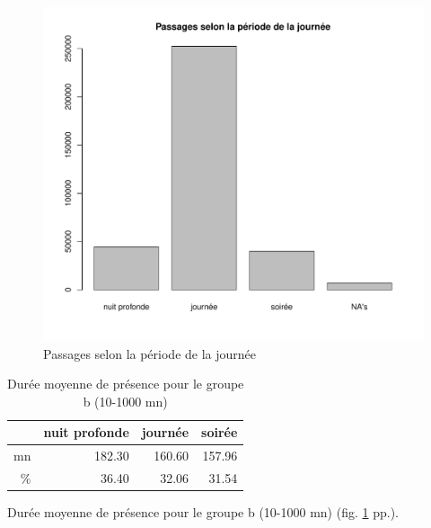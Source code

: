 \documentclass[12pt,english,french,twoside]{book}\usepackage[]{graphicx}\usepackage[]{color}
\makeatletter
\def\maxwidth{ %
  \ifdim\Gin@nat@width>\linewidth
    \linewidth
  \else
    \Gin@nat@width
  \fi
}
\newenvironment{knitrout}{}{} %
\makeatother
\begin{document}
\begin{figure}[ht!]
 \centering
\begin{knitrout}
\color{fgcolor}
\includegraphics[width=\maxwidth]{figure/periode_1} 

\end{knitrout}

 \caption{Passages selon la période de la journée}
 \label{fig:bp_periode1}
\end{figure}

\begin{table}[ht]
\centering
\begin{tabular}{rrrr}
  \hline
 & nuit profonde & journée & soirée \\ 
  \hline
mn & 182.30 & 160.60 & 157.96 \\ 
  \% & 36.40 & 32.06 & 31.54 \\ 
   \hline
\end{tabular}
\caption{Durée moyenne de présence pour le groupe b (10-1000 mn)} 
\label{b_periode}
\end{table}



Durée moyenne de présence pour le groupe b (10-1000 mn) (fig. \ref{b_periode} pp.\pageref{b_periode}).
\end{document}
